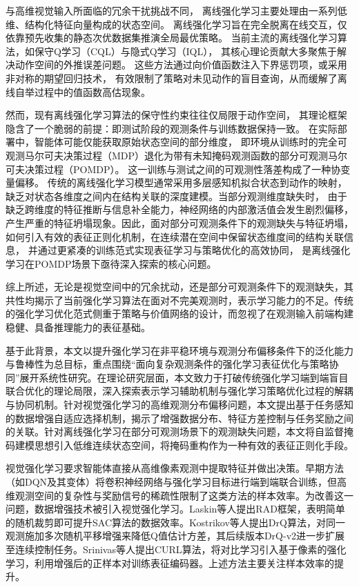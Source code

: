 与高维视觉输入所面临的冗余干扰挑战不同，
离线强化学习主要处理由一系列低维、结构化特征向量构成的状态空间。
离线强化学习旨在完全脱离在线交互，仅依靠预先收集的静态次优数据集推演全局最优策略。
当前主流的离线强化学习算法，如保守Q学习（CQL）与隐式Q学习（IQL），
其核心理论贡献大多聚焦于解决动作空间的外推误差问题。
这些方法通过向价值函数注入下界惩罚项，或采用非对称的期望回归技术，
有效限制了策略对未见动作的盲目查询，从而缓解了离线自举过程中的值函数高估现象。

然而，现有离线强化学习算法的保守性约束往往仅局限于动作空间，
其理论框架隐含了一个脆弱的前提：即测试阶段的观测条件与训练数据保持一致。
在实际部署中，智能体可能仅能获取原始状态空间的部分维度，
即环境从训练时的完全可观测马尔可夫决策过程（MDP）退化为带有未知掩码观测函数的部分可观测马尔可夫决策过程（POMDP）\cite{kaelbling1998planning}。
这一训练与测试之间的可观测性落差构成了一种协变量偏移\cite{kumar2020implicit}。
传统的离线强化学习模型通常采用多层感知机拟合状态到动作的映射，
缺乏对状态各维度之间内在结构关联的深度建模\cite{chen2021decision}。当部分观测维度缺失时，
由于缺乏跨维度的特征推断与信息补全能力，神经网络的内部激活值会发生剧烈偏移，
产生严重的特征坍塌现象。因此，面对部分可观测条件下的观测缺失与特征坍塌，
如何引入有效的表征正则化机制，在连续潜在空间中保留状态维度间的结构关联信息，
并通过更紧凑的训练范式实现表征学习与策略优化的高效协同，
是离线强化学习在POMDP场景下亟待深入探索的核心问题。

综上所述，无论是视觉空间中的冗余扰动，还是部分可观测条件下的观测缺失，其共性均揭示了当前强化学习算法在面对不完美观测时，表示学习能力的不足。传统的强化学习优化范式侧重于策略与价值网络的设计，而忽视了在观测输入前端构建稳健、具备推理能力的表征基础。

基于此背景，本文以提升强化学习在非平稳环境与观测分布偏移条件下的泛化能力与鲁棒性为总目标，重点围绕“面向复杂观测条件的强化学习表征优化与策略协同”展开系统性研究。在理论研究层面，本文致力于打破传统强化学习端到端盲目联合优化的理论局限，深入探索表示学习辅助机制与强化学习策略优化过程的解耦与协同机制。针对视觉强化学习的高维观测分布偏移问题，本文提出基于任务感知的数据增强自适应选择机制，揭示了增强数据分布、特征方差控制与任务奖励之间的关联。针对离线强化学习在部分可观测场景下的观测缺失问题，本文将自监督掩码建模思想引入低维连续状态空间，将掩码重构作为一种有效的表征正则化手段。


视觉强化学习要求智能体直接从高维像素观测中提取特征并做出决策。早期方法（如DQN及其变体）将卷积神经网络与强化学习目标进行端到端联合训练，但高维观测空间的复杂性与奖励信号的稀疏性限制了这类方法的样本效率。为改善这一问题，数据增强技术被引入视觉强化学习。Laskin\cite{laskin2020reinforcement}等人提出RAD框架，表明简单的随机裁剪即可提升SAC算法的数据效率。Kostrikov\cite{kostrikov2020image}等人提出DrQ算法，对同一观测施加多次随机平移增强来降低Q值估计方差，其后续版本DrQ-v2\cite{yarats2021mastering}进一步扩展至连续控制任务。Srinivas等人提出CURL\cite{srinivas2020curl}算法，将对比学习引入基于像素的强化学习，利用增强后的正样本对训练表征编码器。上述方法主要关注样本效率的提升。

